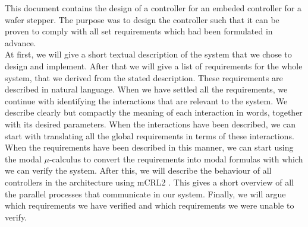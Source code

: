 This document contains the design of a controller for an embeded controller for a wafer stepper. The purpose was to design the controller such that it can be proven to comply with all set requirements which had been formulated in advance.\\

At first, we will give a short textual description of the system that we chose to design and implement. After that we will give a list of requirements for the whole system, that we derived from the stated description. These requirements are described in natural language. When we have settled all the requirements, we continue with identifying the interactions that are relevant to the system. We describe clearly but compactly the meaning of each interaction in words, together with its desired parameters. When the interactions have been described, we can start with translating all the global requirements in terms of these interactions. When the requirements have been described in this manner, we can start using the modal $\mu$-calculus to convert the requirements into modal formulas with which we can verify the system. After this, we will describe the behaviour of all controllers in the architecture using mCRL2 \cite{url:mcrl}. This gives a short overview of all the parallel processes that communicate in our system. Finally, we will argue which requirements we have verified and which requirements we were unable to verify.